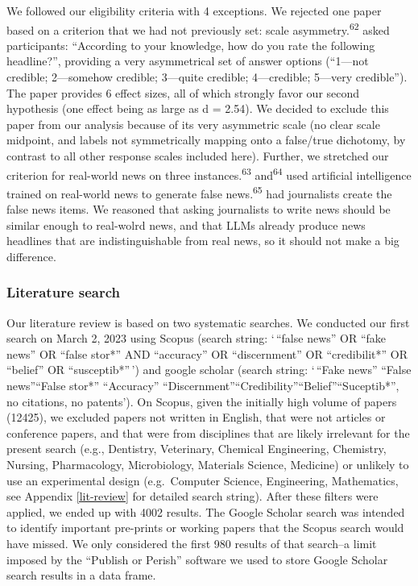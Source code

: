 \documentclass[
  doc,floatsintext]{apa6}
\begin{document}
We followed our eligibility criteria with 4 exceptions. We rejected one paper based on a criterion that we had not previously set: scale asymmetry.\textsuperscript{62} asked participants: ``According to your knowledge, how do you rate the following headline?'', providing a very asymmetrical set of answer options (``1---not credible; 2---somehow credible; 3---quite credible; 4---credible; 5---very credible''). The paper provides 6 effect sizes, all of which strongly favor our second hypothesis (one effect being as large as d = 2.54). We decided to exclude this paper from our analysis because of its very asymmetric scale (no clear scale midpoint, and labels not symmetrically mapping onto a false/true dichotomy, by contrast to all other response scales included here). Further, we stretched our criterion for real-world news on three instances.\textsuperscript{63} and\textsuperscript{64} used artificial intelligence trained on real-world news to generate false news.\textsuperscript{65} had journalists create the false news items. We reasoned that asking journalists to write news should be similar enough to real-wolrd news, and that LLMs already produce news headlines that are indistinguishable from real news, so it should not make a big difference.

\subsubsection{Literature search}\label{literature-search}

Our literature review is based on two systematic searches. We conducted our first search on March 2, 2023 using Scopus (search string: `\,``false news'' OR ``fake news'' OR ``false stor*'' AND ``accuracy'' OR ``discernment'' OR ``credibilit*'' OR ``belief'' OR ``susceptib*''\,') and google scholar (search string: `\,``Fake news'' \textbar{} ``False news''\textbar{}``False stor*'' ``Accuracy'' \textbar{} ``Discernment''\textbar{}``Credibility''\textbar{}``Belief''\textbar{}``Suceptib*'', no citations, no patents'). On Scopus, given the initially high volume of papers (12425), we excluded papers not written in English, that were not articles or conference papers, and that were from disciplines that are likely irrelevant for the present search (e.g., Dentistry, Veterinary, Chemical Engineering, Chemistry, Nursing, Pharmacology, Microbiology, Materials Science, Medicine) or unlikely to use an experimental design (e.g.~Computer Science, Engineering, Mathematics, see Appendix \ref{lit-review} for detailed search string). After these filters were applied, we ended up with 4002 results. The Google Scholar search was intended to identify important pre-prints or working papers that the Scopus search would have missed. We only considered the first 980 results of that search--a limit imposed by the ``Publish or Perish'' software we used to store Google Scholar search results in a data frame.
\end{document}
